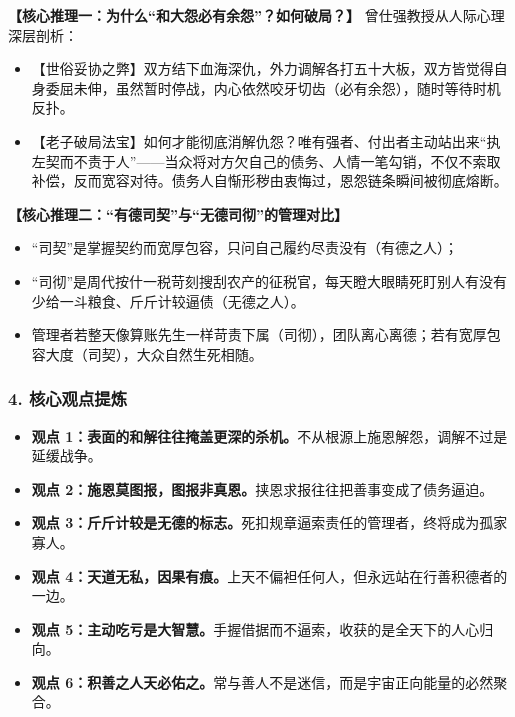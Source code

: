 \noindent\textbf{【核心推理一：为什么“和大怨必有余怨”？如何破局？】}
曾仕强教授从人际心理深层剖析：
\begin{itemize}
    \item 【世俗妥协之弊】双方结下血海深仇，外力调解各打五十大板，双方皆觉得自身委屈未伸，虽然暂时停战，内心依然咬牙切齿（必有余怨），随时等待时机反扑。
    \item 【老子破局法宝】如何才能彻底消解仇怨？唯有强者、付出者主动站出来“执左契而不责于人”——当众将对方欠自己的债务、人情一笔勾销，不仅不索取补偿，反而宽容对待。债务人自惭形秽由衷悔过，恩怨链条瞬间被彻底熔断。
\end{itemize}

\noindent\textbf{【核心推理二：“有德司契”与“无德司彻”的管理对比】}
\begin{itemize}
    \item “司契”是掌握契约而宽厚包容，只问自己履约尽责没有（有德之人）；
    \item “司彻”是周代按什一税苛刻搜刮农产的征税官，每天瞪大眼睛死盯别人有没有少给一斗粮食、斤斤计较逼债（无德之人）。
    \item 管理者若整天像算账先生一样苛责下属（司彻），团队离心离德；若有宽厚包容大度（司契），大众自然生死相随。
\end{itemize}

\subsubsection{4. 核心观点提炼}
\begin{itemize}
    \item \textbf{观点 1：表面的和解往往掩盖更深的杀机。}不从根源上施恩解怨，调解不过是延缓战争。
    \item \textbf{观点 2：施恩莫图报，图报非真恩。}挟恩求报往往把善事变成了债务逼迫。
    \item \textbf{观点 3：斤斤计较是无德的标志。}死扣规章逼索责任的管理者，终将成为孤家寡人。
    \item \textbf{观点 4：天道无私，因果有痕。}上天不偏袒任何人，但永远站在行善积德者的一边。
    \item \textbf{观点 5：主动吃亏是大智慧。}手握借据而不逼索，收获的是全天下的人心归向。
    \item \textbf{观点 6：积善之人天必佑之。}常与善人不是迷信，而是宇宙正向能量的必然聚合。
\end{itemize}

